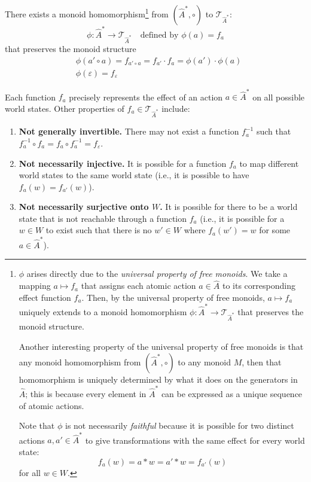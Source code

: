 There exists a monoid homomorphism\footnote{
    $\phi$ arises directly due to the \emph{universal property of free monoids}.
    We take a mapping $a \mapsto f_{a}$ that assigns each atomic action $a \in \hat{A}$ to its corresponding effect function $f_{a}$.
    Then, by the universal property of free monoids, $a \mapsto f_{a}$ uniquely extends to a monoid homomorphism $\phi : \hat{A}^{*} \to \mathcal{T}_{\hat{A}^{*}}$ that preserves the monoid structure.

    Another interesting property of the universal property of free monoids is that any monoid homomorphism from $(\hat{A}^{*}, \circ)$ to any monoid $M$, then that homomorphism is uniquely determined by what it does on the generators in $\hat{A}$;
    this is because every element in $\hat{A}^{*}$ can be expressed as a unique sequence of atomic actions.

    Note that $\phi$ is not necessarily \emph{faithful} because it is possible for two distinct actions $a, a' \in \hat{A}^{*}$ to give transformations with the same effect for every world state:
    \begin{equation}
        f_{a}(w) = a \ast w = a' \ast w = f_{a'}(w)
    \end{equation}
    for all $w \in W$.
} from $(\hat{A}^{*}, \circ)$ to $\mathcal{T}_{\hat{A}^{*}}$:
\begin{equation}
    \label{eqn:monoid_homomorphism_from_free_monoid_to_set_of_functions}
    \phi : \hat{A}^{*} \to \mathcal{T}_{\hat{A}^{*}} \quad\text{defined by $\phi(a) = f_{a}$}
\end{equation}
that preserves the monoid structure
\begin{align}
	 & \phi(a' \circ a) = f_{a' \circ a} = f_{a'} \cdot f_{a} = \phi(a') \cdot \phi(a) \\
	 & \phi(\varepsilon) = f_{\varepsilon}
\end{align}

Each function $f_{a}$ precisely represents the effect of an action $a \in \hat{A}^{*}$ on all possible world states.
Other properties of $f_{a} \in \mathcal{T}_{\hat{A}^{*}}$ include:
\begin{enumerate}
    \item \textbf{Not generally invertible.}
    There may not exist a function $f_{a}^{-1}$ such that $f_{a}^{-1} \circ f_{a} = f_{a} \circ f_{a}^{-1} = f_{\varepsilon}$.
    \item \textbf{Not necessarily injective.}
    It is possible for a function $f_{a}$ to map different world states to the same world state (i.e., it is possible to have $f_{a}(w) = f_{a'}(w)$).
    \item \textbf{Not necessarily surjective onto $W$.}
    It is possible for there to be a world state that is not reachable through a function $f_{a}$ (i.e., it is possible for a $w \in W$ to exist such that there is no $w' \in W$ where $f_{a}(w') = w$ for some $a \in \hat{A}^{*}$).
\end{enumerate}

